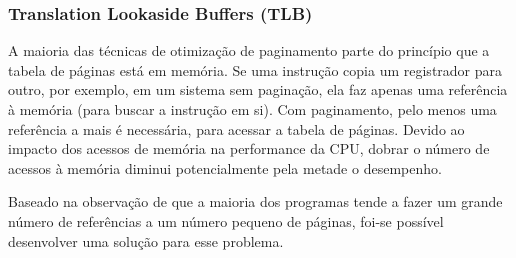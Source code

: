 \documentclass[10pt]{article}
\begin{document}
\subsubsection{Translation Lookaside Buffers (TLB)}
\par \indent A maioria das técnicas de otimização de paginamento parte do princípio que
a tabela de páginas está em memória. Se uma instrução copia um registrador para outro,
por exemplo, em um sistema sem paginação, ela faz apenas uma referência à memória 
(para buscar a instrução em si). Com paginamento, pelo menos uma referência a mais
é necessária, para acessar a tabela de páginas. Devido ao impacto dos acessos de 
memória na performance da CPU, dobrar o número de acessos à memória diminui potencialmente
pela metade o desempenho.
    \par
\indent Baseado na observação de que a maioria dos programas tende a fazer um grande 
número de referências a um número pequeno de páginas, foi-se possível desenvolver uma 
solução para esse problema.
\end{document}
